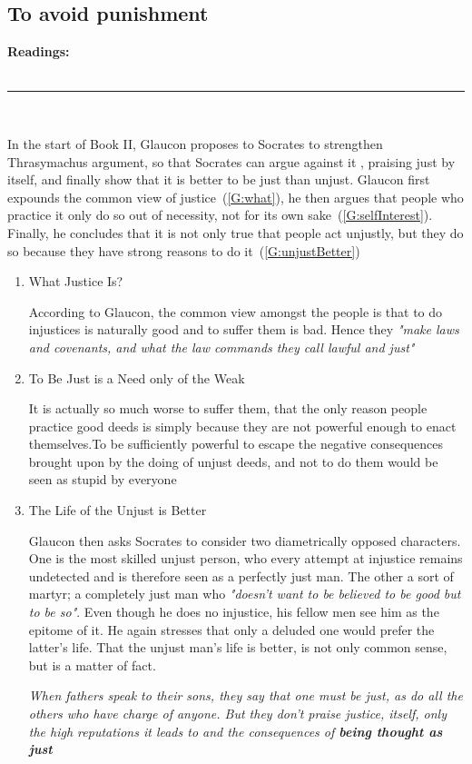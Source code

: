 \documentclass[english,course]{Notes}
\newcommand{\ita}[1]{\textit{#1}}
\newcommand\readings{\textbf{Readings:} \\}
\newcommand\sep{\\ \noindent\rule{10cm}{0.8pt} \\}
\newcommand\quo[1]{\begin{displayquote}\ita{\large{#1}}\end{displayquote}}
\begin{document}
\newpage
\subsection{To avoid punishment}
\readings \cite{PlatoRepublicII}
\sep
{}

\par{In the start of Book II, Glaucon proposes to Socrates  to strengthen Thrasymachus argument, so that Socrates can argue against it , praising just by itself, and finally show that it is better to be just than unjust. Glaucon first expounds the common view of justice~(\ref{G:what}), he then argues that people who practice it only do so out of necessity, not for its own sake~(\ref{G:selfInterest}). Finally, he concludes that it is not only true that people act unjustly, but they do so because they have strong reasons to do it~(\ref{G:unjustBetter})}

\begin{enumerate}

	\item{What Justice Is?~\label{G:what}}
		\par{According to Glaucon, the common view amongst the people is that to do injustices is naturally good and to suffer them is bad. Hence they \ita{"make laws and covenants, and what the law commands they call lawful and just"}}
		
	\item{To Be Just is a Need only of the Weak~\label{G:selfInterest}}
		\par{It is actually so much worse to suffer them, that the only reason people practice good deeds is simply because they are not powerful enough to enact themselves.To be sufficiently powerful to escape the negative consequences brought upon by the doing of unjust deeds, and not to do them would be seen as stupid by everyone~}
	 
	\item{The Life of the Unjust is Better~\label{G:unjustBetter}}
		\par{Glaucon then asks Socrates to consider two diametrically opposed characters. One is the most skilled unjust person, who every attempt at injustice remains undetected and is therefore seen as a perfectly just man. The other a sort of martyr; a completely just man who \ita{"doesn't want to be believed to be good but to be so"}. Even though he does no injustice, his fellow men see him as the epitome of it. He again stresses that only a deluded one would prefer the latter's life. That the unjust man's life is better, is not only common sense, but is a matter of fact.
		
		\quo{When fathers speak to their sons, they say that one must be just, as do all the others who have charge of anyone. But they don't praise justice, itself, only the high reputations it leads to and the consequences of \textbf{being thought as just}}}
	
\end{enumerate}
\end{document}
